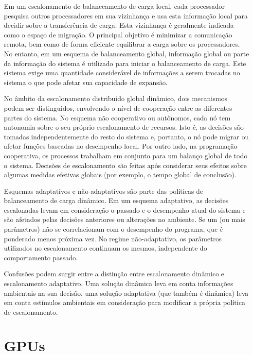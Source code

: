 Em um escalonamento de balanceamento de carga local, cada processador pesquisa outros processadores em sua vizinhança e usa esta informação local para decidir sobre a transferência de carga. Esta vizinhança é geralmente indicada como o espaço de migração. O principal objetivo é minimizar a comunicação remota, bem como de forma eficiente equilibrar a carga sobre os processadores. No entanto, em um esquema de balanceamento global, informação global ou  parte da informação do sistema é utilizado para iniciar o balanceamento de carga. Este sistema exige uma quantidade considerável de informações a serem trocadas no sistema o que pode afetar sua capacidade de expansão.

No âmbito da escalonamento distribuído global dinâmico, dois mecanismos podem ser distinguidos, envolvendo o nível de cooperação entre as diferentes partes do sistema. No esquema não cooperativo ou autônomos, cada nó tem autonomia sobre o seu próprio escalonamento de recursos. Isto é, as decisões são tomadas independentemente do resto do sistema e, portanto, o nó pode migrar ou afetar funções baseadas no desempenho local. Por outro lado, na programação cooperativa, os processos trabalham em conjunto para um balanço global de todo o sistema. Decisões de escalonamento são feitas após considerar seus efeitos sobre algumas medidas efetivas globais (por exemplo, o tempo global de conclusão).

Esquemas adaptativos e não-adaptativos são parte das políticas de balanceamento de carga dinâmico. Em um esquema adaptativo, as decisões escalonadas levam em consideração o passado e o desempenho atual do sistema e são afetados pelas decisões anteriores ou alterações no ambiente. Se um (ou mais parâmetros) não se correlacionam com o desempenho do programa, que é ponderado menos próxima vez. No regime não-adaptativo, os parâmetros utilizados no escalonamento continuam os mesmos, independente do comportamento passado. 
	
Confusões podem surgir entre a distinção entre escalonamento dinâmico e escalonamento adaptativo. Uma solução dinâmica leva em conta informações ambientais na sua decisão, uma solução adaptativa (que também é dinâmica) leva em conta estímulos ambientais em consideração para modificar a própria política de escalonamento.



\section{GPUs}\label{intro:historico}


